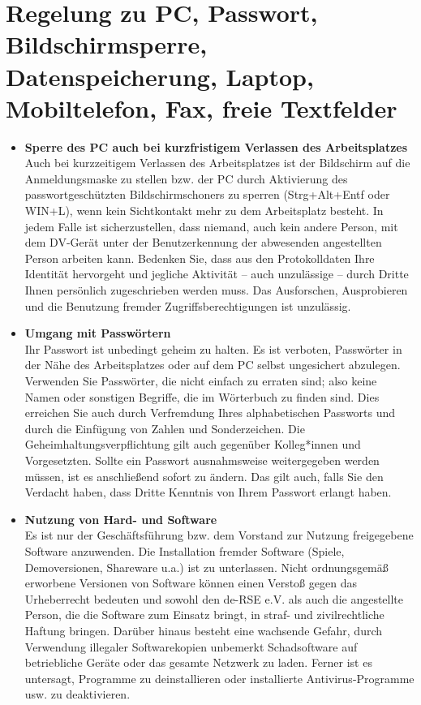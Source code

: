\documentclass[a4paper, fontsize=11pt]{scrartcl}
\begin{document}
\section{Regelung zu PC, Passwort, Bildschirmsperre, Datenspeicherung, Laptop,
Mobiltelefon, Fax, freie Textfelder}
\begin{itemize}
  \item \textbf{Sperre des PC auch bei kurzfristigem Verlassen des Arbeitsplatzes}\\ Auch bei kurzzeitigem Verlassen des Arbeitsplatzes ist der Bildschirm auf die Anmeldungsmaske zu stellen bzw. der PC durch Aktivierung des passwortgeschützten Bildschirmschoners zu sperren (Strg+Alt+Entf oder WIN+L), wenn kein Sichtkontakt mehr zu dem Arbeitsplatz besteht. In jedem Falle ist sicherzustellen, dass niemand, auch kein andere Person, mit dem DV-Gerät unter der Benutzerkennung der abwesenden angestellten Person arbeiten kann. Bedenken Sie, dass aus den Protokolldaten Ihre Identität hervorgeht und jegliche Aktivität – auch unzulässige – durch Dritte Ihnen persönlich zugeschrieben werden muss. Das Ausforschen, Ausprobieren und die Benutzung fremder Zugriffsberechtigungen ist unzulässig.
  \item \textbf{Umgang mit Passwörtern} \\ Ihr Passwort ist unbedingt geheim zu halten. Es ist verboten, Passwörter in der Nähe des Arbeitsplatzes oder auf dem PC selbst ungesichert abzulegen. Verwenden Sie Passwörter, die nicht einfach zu erraten sind; also keine Namen oder sonstigen Begriffe, die im Wörterbuch zu finden sind. Dies erreichen Sie auch durch Verfremdung Ihres alphabetischen Passworts und durch die Einfügung von Zahlen und Sonderzeichen.
  Die Geheimhaltungsverpflichtung gilt auch gegenüber Kolleg*innen und Vorgesetzten. Sollte ein Passwort ausnahmsweise weitergegeben werden müssen, ist es anschließend sofort zu ändern. Das gilt auch, falls Sie den Verdacht haben, dass Dritte Kenntnis von Ihrem Passwort erlangt haben.
  \item \textbf{Nutzung von Hard- und Software} \\ Es ist nur der Geschäftsführung bzw. dem Vorstand zur Nutzung freigegebene Software anzuwenden. Die Installation fremder Software (Spiele, Demoversionen, Shareware u.a.) ist zu unterlassen.
  Nicht ordnungsgemäß erworbene Versionen von Software können einen Verstoß gegen das Urheberrecht bedeuten und sowohl den de-RSE e.V. als auch die angestellte Person, die die Software zum Einsatz bringt, in straf- und zivilrechtliche Haftung bringen. Darüber hinaus besteht eine wachsende Gefahr, durch Verwendung illegaler Softwarekopien unbemerkt Schadsoftware auf betriebliche Geräte oder das gesamte Netzwerk zu laden. Ferner ist es untersagt, Programme zu deinstallieren oder installierte Antivirus-Programme usw. zu deaktivieren.

\end{itemize}
\end{document}

